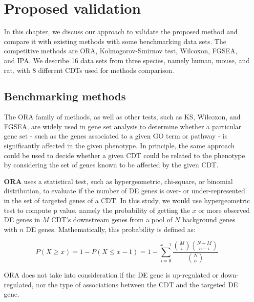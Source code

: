

\section{Proposed validation}

In this chapter, we discuss our approach to validate the proposed method and compare it with existing methods with some benchmarking data sets. The competitive methods are ORA, Kolmogorov-Smirnov test, Wilcoxon, FGSEA, and IPA. We describe 16 data sets from three species, namely human, mouse, and rat, with 8 different CDTs used for methods comparison. %

\subsection{Benchmarking methods}

The ORA family of methods, as well as other tests, such as KS, Wilcoxon, and FGSEA, are widely used in gene set analysis to determine whether  a particular gene set - such as the genes associated to a given GO term or pathway - is significantly affected in the given phenotype. In principle, the same approach could be used to decide whether a given CDT could be related to the phenotype by considering the set of genes known to be affected by the given CDT. 

\textbf{ORA} uses a statistical test, such as hypergeometric, chi-square, or binomial distribution, to evaluate if the number of DE genes is over- or under-represented in the set of targeted genes of a CDT. In this study, we would use hypergeometric test to compute p value, namely the probability of getting the $x$ or more observed DE genes in $M$ CDT's downstream genes from a pool of $N$ background genes with $n$ DE genes. Mathematically, this probability is defined as:

\begin{equation*}
P(X \geq x) = 1-P(X \leq x -1)= 1- \sum_{i=0}^{x-1} \frac{\binom{M}{i}\binom{N-M}{n-i}}{\binom{N}{n}} 
\end{equation*}

ORA does not take into consideration if the DE gene is up-regulated or down-regulated, nor the type of associations between the CDT and the targeted DE gene.

